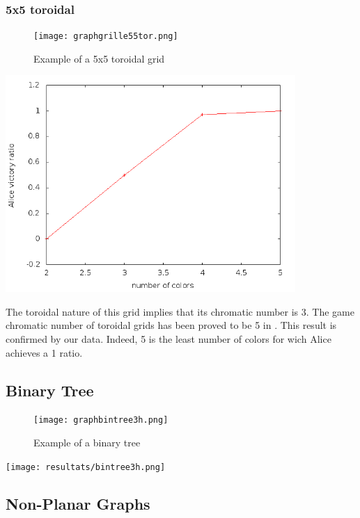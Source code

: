\subsubsection{5x5 toroidal}

\begin{figure}[h]
\begin{center}  
	\texttt{[image: graphgrille55tor.png]}
\end{center}
    \caption{Example of a 5x5 toroidal grid}
    \label{grid55tor}
\end{figure}

\includegraphics[width=11cm]{resultats/grilletor55.png}

The toroidal nature of this grid implies that its chromatic number is 3. The game chromatic number of toroidal grids has been proved to be 5 in \cite{Raspaud20091183}. This result is confirmed by our data. Indeed, 5 is the least number of colors for wich Alice achieves a 1 ratio.

\subsection{Binary Tree}

\begin{figure}[h]
\begin{center}  
	\texttt{[image: graphbintree3h.png]}
\end{center}
    \caption{Example of a binary tree}
    \label{btree}
\end{figure}

\texttt{[image: resultats/bintree3h.png]}

\subsection{Non-Planar Graphs}

